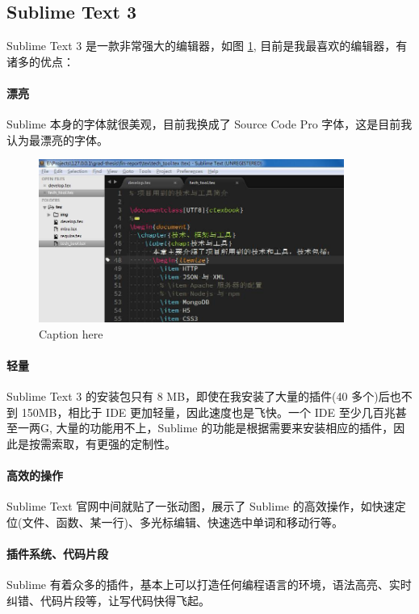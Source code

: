 \documentclass[UTF8]{ctexbook}
\begin{document}
{{        \subsection{Sublime Text 3}
          \label{subsec:sublime_text_3}
            Sublime Text 3 是一款非常强大的编辑器，如图 \ref{fig:sublime}, 目前是我最喜欢的编辑器，有诸多的优点：
            \paragraph{漂亮} Sublime 本身的字体就很美观，目前我换成了 Source Code Pro 字体，这是目前我认为最漂亮的字体。
            \begin{figure}[H]
              \centering
              \includegraphics[width=10cm]{./img/sublime.jpg}
              \caption{Caption here}
              \label{fig:sublime}
            \end{figure}

            \paragraph{轻量} Sublime Text 3 的安装包只有 8 MB，即使在我安装了大量的插件(40 多个)后也不到 150MB，相比于 IDE 更加轻量，因此速度也是飞快。一个 IDE 至少几百兆甚至一两G, 大量的功能用不上，Sublime 的功能是根据需要来安装相应的插件，因此是按需索取，有更强的定制性。

            \paragraph{高效的操作} Sublime Text 官网中间就贴了一张动图，展示了 Sublime 的高效操作，如快速定位(文件、函数、某一行)、多光标编辑、快速选中单词和移动行等。

            \paragraph{插件系统、代码片段} Sublime 有着众多的插件，基本上可以打造任何编程语言的环境，语法高亮、实时纠错、代码片段等，让写代码快得飞起。

}}
\end{document}
